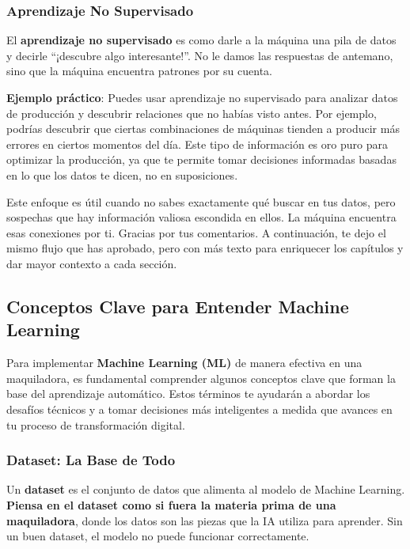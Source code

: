 \documentclass[
  10pt,
  letterpaper,
]{book}
\begin{document}
\subsubsection{\texorpdfstring{\textbf{Aprendizaje No
Supervisado}}{Aprendizaje No Supervisado}}\label{aprendizaje-no-supervisado-1}

El \textbf{aprendizaje no supervisado} es como darle a la máquina una
pila de datos y decirle ``¡descubre algo interesante!''. No le damos las
respuestas de antemano, sino que la máquina encuentra patrones por su
cuenta.

\textbf{Ejemplo práctico}: Puedes usar aprendizaje no supervisado para
analizar datos de producción y descubrir relaciones que no habías visto
antes. Por ejemplo, podrías descubrir que ciertas combinaciones de
máquinas tienden a producir más errores en ciertos momentos del día.
Este tipo de información es oro puro para optimizar la producción, ya
que te permite tomar decisiones informadas basadas en lo que los datos
te dicen, no en suposiciones.

Este enfoque es útil cuando no sabes exactamente qué buscar en tus
datos, pero sospechas que hay información valiosa escondida en ellos. La
máquina encuentra esas conexiones por ti. Gracias por tus comentarios. A
continuación, te dejo el mismo flujo que has aprobado, pero con más
texto para enriquecer los capítulos y dar mayor contexto a cada sección.

\subsection{Conceptos Clave para Entender Machine
Learning}\label{conceptos-clave-para-entender-machine-learning}

Para implementar \textbf{Machine Learning (ML)} de manera efectiva en
una maquiladora, es fundamental comprender algunos conceptos clave que
forman la base del aprendizaje automático. Estos términos te ayudarán a
abordar los desafíos técnicos y a tomar decisiones más inteligentes a
medida que avances en tu proceso de transformación digital.

\subsubsection{\texorpdfstring{\textbf{Dataset: La Base de
Todo}}{Dataset: La Base de Todo}}\label{dataset-la-base-de-todo}

Un \textbf{dataset} es el conjunto de datos que alimenta al modelo de
Machine Learning. \textbf{Piensa en el dataset como si fuera la materia
prima de una maquiladora}, donde los datos son las piezas que la IA
utiliza para aprender. Sin un buen dataset, el modelo no puede funcionar
correctamente.
\end{document}
